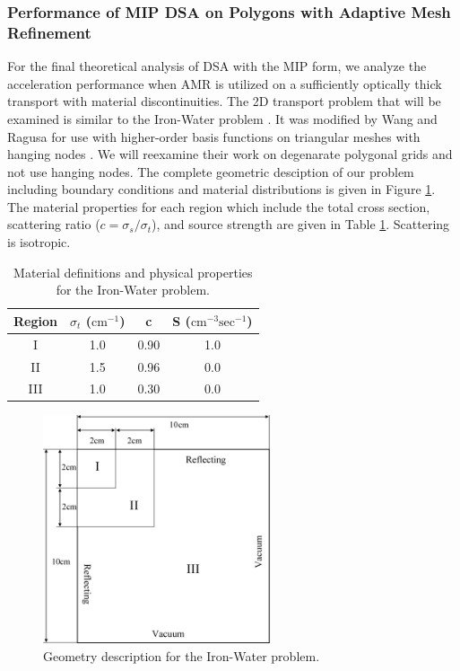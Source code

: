 \subsubsection{Performance of MIP DSA on Polygons with Adaptive Mesh Refinement}
\label{sec::DSA_Results_1G_AMR}

For the final theoretical analysis of DSA with the MIP form, we analyze the acceleration performance when AMR is utilized on a sufficiently optically thick transport with material discontinuities. The 2D transport problem that will be examined is similar to the Iron-Water problem \cite{khalil1985nodal}. It was modified by Wang and Ragusa for use with higher-order basis functions on triangular meshes with hanging nodes \cite{ref::DSA_wang_ragusa}. We will reexamine their work on degenarate polygonal grids and not use hanging nodes. The complete geometric desciption of our problem including boundary conditions and material distributions is given in Figure \ref{fig::DSA_IW_Description}. The material properties for each region which include the total cross section, scattering ratio ($c=\sigma_s/\sigma_t$), and source strength are given in Table \ref{tab::DSA_IW_mats}. Scattering is isotropic. 

\begin{table}
\caption{Material definitions and physical properties for the Iron-Water problem.}
\centering
\def\arraystretch{1.2}
\begin{tabular}{|c|c|c|c|}
\hline
Region & $\sigma_t$ ($\text{cm}^{-1}$) & c  & S ($\text{cm}^{-3} \text{sec}^{-1}$) \\
\hline
I & 1.0 & 0.90 & 1.0 \\
\hline
II & 1.5 & 0.96 & 0.0 \\
\hline
III & 1.0 & 0.30 & 0.0\\
\hline
\end{tabular}
\label{tab::DSA_IW_mats}
\end{table}

\begin{figure}
\centering
\includegraphics[width=0.60\textwidth]{figures/sec_DSA/IW_Description.png}
\caption{Geometry description for the Iron-Water problem.}
\label{fig::DSA_IW_Description}
\end{figure}

